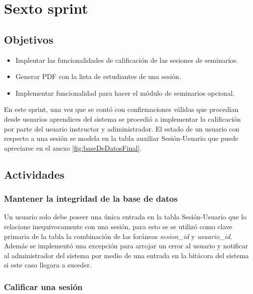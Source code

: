 \section{Sexto sprint} %
\label{sec:sexto_sprint}

\subsection{Objetivos}

\begin{itemize}
	\item Implentar las funcionalidades de calificación de las sesiones de seminarios.
	\item Generar PDF con la lista de estudiantes de una sesión.
	\item Implementar funcionalidad para hacer el módulo de seminarios opcional.
\end{itemize}

En este sprint, una vez que se contó con confirmaciones válidas que procedian desde usuarios aprendices del sistema se procedió a implementar la calificación por parte del usuario instructor y adiministrador. El estado de un usuario con respecto a una sesión se modela en la tabla auxiliar Sesión-Usuario que puede apreciarse en el anexo \ref{fig:baseDeDatosFinal}.

\subsection{Actividades} %
\label{sub:actividades6}

\subsubsection{Mantener la integridad de la base de datos}

Un usuario solo debe poseer una única entrada en la tabla Sesión-Usuario que lo relacione inequivocamente con una sesión, para esto se se utilizó como clave primaria de la tabla la combinación de las foráneas \emph{sesion\_id} y \emph{usuario\_id}. Además se implementó una excepción para arrojar un error al usuario y notificar al administrador del sistema por medio de una entrada en la bitácora del sistema si este caso llegara a suceder.

\subsubsection{Calificar una sesión}

